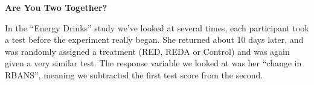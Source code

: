 \def\theTopic{Pairing }
\def\dayNum{25 }



\begin{center}
{\bf {\large Are You Two Together? }}\\
\end{center}



   In the ``Energy Drinks'' study we've looked at
  several times, each participant took a test  before the
  experiment really began. She  returned about 10 days later, and was
  randomly assigned a treatment (RED, REDA or Control) and was again
  given a very similar test.  The response variable we looked at
  was her ``change in RBANS'', meaning we subtracted the first test
  score from the second.   
